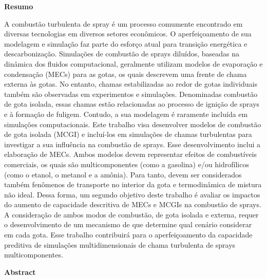 
\vspace{2cm}

{ \Large \textbf{Resumo}}

\vspace{0.8cm}

{

\noindent %
A combustão turbulenta de spray é um processo comumente encontrado em diversas tecnologias em diversos setores econômicos. 
O aperfeiçoamento de sua modelagem e simulação faz parte do esforço atual para transição energética e descarbonização.
Simulações de combustão de sprays diluídos, baseadas na dinâmica dos fluidos computacional, geralmente utilizam modelos de evaporação e condensação (MECs) para as gotas, os quais descrevem uma frente de chama externa às gotas.
No entanto, chamas estabilizadas ao redor de gotas individuais também são observadas em experimentos e simulações.
Denominadas combustão de gota isolada, essas chamas estão relacionadas ao processo de ignição de sprays e à formação de fuligem.
Contudo, a sua modelagem é raramente incluída em simulações computacionais.
Este trabalho visa desenvolver modelos de combustão de gota isolada (MCGI) e incluí-los em simulações de chamas turbulentas para investigar a sua influência na combustão de sprays.
Esse desenvolvimento inclui a elaboração de MECs.
Ambos modelos devem representar efeitos de combustíveis comerciais, os quais são multicomponentes (como a gasolina) e/ou hidrofílicos (como o etanol, o metanol e a amônia). 
Para tanto, devem ser considerados também fenômenos de transporte no interior da gota e termodinâmica de mistura não ideal.
Dessa forma, um segundo objetivo deste trabalho é avaliar os impactos do aumento de capacidade descritiva de MECs e MCGIs na combustão de sprays.
A consideração de ambos modos de combustão, de gota isolada e externa, requer o desenvolvimento de um mecanismo de que determine qual cenário considerar em cada gota.
Esse trabalho contribuirá para o aperfeiçoamento da capacidade preditiva de simulações multidimensionais de chama turbulenta de sprays multicomponentes.

}

\vfil

{ \Large \textbf{Abstract}}

\vspace{0.8cm}

